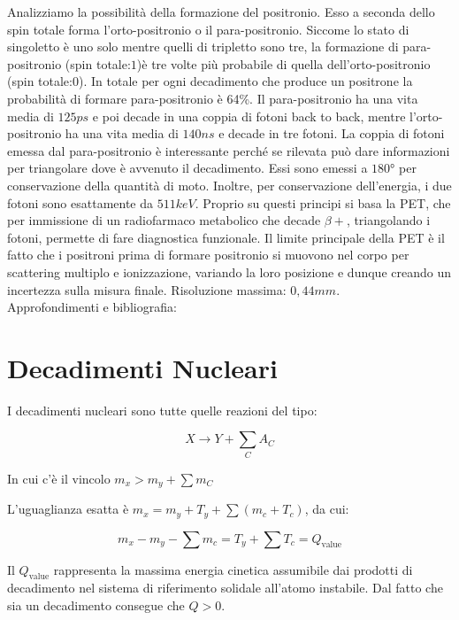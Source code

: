 \documentclass [a4paper, twoside] {book}
\begin{document}
Analizziamo la possibilità della formazione del positronio. Esso a seconda dello spin totale forma l'orto-positronio o il para-positronio. Siccome lo stato di singoletto è uno solo mentre quelli di tripletto sono tre, la formazione di para-positronio (spin totale:$1$)è tre volte più probabile di quella dell'orto-positronio (spin totale:$0$). 
In totale per ogni decadimento che produce un positrone la probabilità di formare para-positronio è 64\%. 
Il para-positronio ha una vita media di $125 ps$ e poi decade in una coppia di fotoni back to back, mentre l'orto-positronio ha una vita media di $140 ns$ e decade in tre fotoni. La coppia di fotoni emessa dal para-positronio è interessante perché se rilevata può dare informazioni per triangolare dove è avvenuto il decadimento. Essi sono emessi a $\ang{180}$ per conservazione della quantità di moto. Inoltre, per conservazione dell'energia, i due fotoni sono esattamente da $511 keV$.
Proprio su questi principi si basa la PET, che per immissione di un radiofarmaco metabolico che decade $\beta+$, triangolando i fotoni, permette di fare diagnostica funzionale.
Il limite principale della PET è il fatto che i positroni prima di formare positronio si muovono nel corpo per scattering multiplo e ionizzazione, variando la loro posizione e dunque creando un incertezza sulla misura finale.
Risoluzione massima: $0,44 mm$.\\

Approfondimenti e bibliografia: \cite{PET1} \cite{PET2}

\chapter{Decadimenti Nucleari}

I decadimenti nucleari sono tutte quelle reazioni del tipo:

\begin{equation}
X \longrightarrow Y + \sum_C A_C
\end{equation}

In cui c'è il vincolo $m_x>m_y + \sum m_C$

L'uguaglianza esatta è $m_x=m_y+T_y+\sum (m_c+T_c)$, da cui:

\begin{equation}
m_x-m_y-\sum m_c = T_y + \sum T_c = Q_{\text{value}}
\end{equation}

Il $Q_{\text{value}}$ rappresenta la massima energia cinetica assumibile dai prodotti di decadimento nel sistema di riferimento solidale all'atomo instabile. Dal fatto che sia un decadimento consegue che $Q>0$. 
\end{document}
